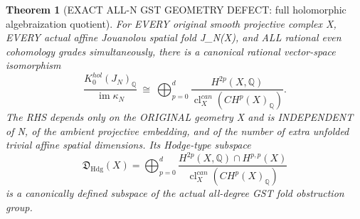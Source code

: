 \documentclass[11pt]{article}
\newtheorem{theorem}{Theorem}
\begin{document}
\begin{theorem}[EXACT ALL-N GST GEOMETRY DEFECT: full holomorphic algebraization quotient]
For EVERY original smooth projective complex X,
EVERY actual affine Jouanolou spatial fold J_N(X),
and ALL rational even cohomology grades simultaneously,
there is a canonical rational vector-space isomorphism
\[
 \boxed{
 \frac{K_0^{hol}(J_N)_{\mathbb Q}}
 {\operatorname{im}\kappa_N}
 \ \cong\
 \bigoplus_{p=0}^{d}
 \frac{H^{2p}(X,\mathbb Q)}
  {\operatorname{cl}^{can}_X(CH^p(X)_{\mathbb Q})}.
 }                                                        \tag{9}
\]
The RHS depends only on the ORIGINAL geometry X
and is INDEPENDENT of N, of the ambient projective
embedding, and of the number of extra unfolded
trivial affine spatial dimensions.
Its Hodge-type subspace
\[
 \boxed{
 \mathfrak D_{\mathrm{Hdg}}(X)=
 \bigoplus_{p=0}^{d}
 \frac{H^{2p}(X,\mathbb Q)\cap H^{p,p}(X)}
 {\operatorname{cl}^{can}_X(CH^p(X)_{\mathbb Q})}
 }                                                        \tag{10}
\]
is a canonically defined subspace of the actual
all-degree GST fold obstruction group.
\end{theorem}
\end{document}
